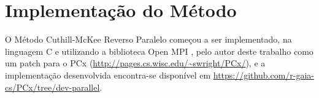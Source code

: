 \section{Implementação do Método}
O Método Cuthill-McKee Reverso Paralelo começou a ser implementado, na
linguagem C e utilizando a biblioteca Open MPI \cite{open_mpi}, pelo autor
deste trabalho como um patch para o PCx
(\url{http://pages.cs.wisc.edu/~swright/PCx/}), e a implementação desenvolvida
encontra-se disponível em
\url{https://github.com/r-gaia-cs/PCx/tree/dev-parallel}.
